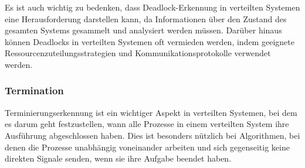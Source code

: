 Es ist auch wichtig zu bedenken, dass Deadlock-Erkennung in verteilten Systemen eine Herausforderung darstellen kann, da Informationen über den Zustand des gesamten Systems gesammelt und analysiert werden müssen. Darüber hinaus können Deadlocks in verteilten Systemen oft vermieden werden, indem geeignete Ressourcenzuteilungsstrategien und Kommunikationsprotokolle verwendet werden.



\subsubsection{Termination}
Terminierungserkennung ist ein wichtiger Aspekt in verteilten Systemen, bei dem es darum geht festzustellen, wann alle Prozesse in einem verteilten System ihre Ausführung abgeschlossen haben. Dies ist besonders nützlich bei Algorithmen, bei denen die Prozesse unabhängig voneinander arbeiten und sich gegenseitig keine direkten Signale senden, wenn sie ihre Aufgabe beendet haben.

